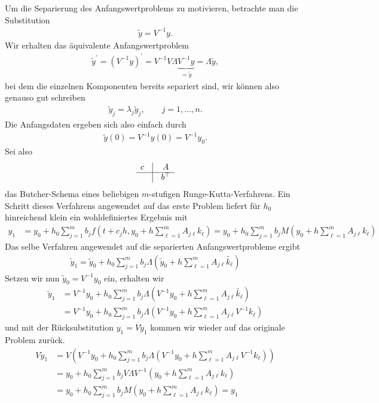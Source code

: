 \begin{solution}
Um die Separierung des Anfangswertproblems zu motivieren, betrachte man die Substitution
\begin{align*}
  \widetilde{y} = V^{-1}y.
\end{align*}
 Wir erhalten das äquivalente Anfangswertproblem
\begin{align*}
  \widetilde{y}^{\prime} = (V^{-1}y)^{\prime} = V^{-1}V\Lambda\underbrace{V^{-1}y}_{ = \widetilde{y}} = \Lambda\widetilde{y},
\end{align*}
bei dem die einzelnen Komponenten bereits separiert sind, wir können also genauso gut schreiben
\begin{align*}
  \widetilde{y}_j = \lambda_j\widetilde{y}_j, \qquad j = 1,\dots,n.
\end{align*}
Die Anfangsdaten ergeben sich also einfach durch
\begin{align*}
   \widetilde{y}(0) = V^{-1}y(0) = V^{-1}y_0.
\end{align*}
Sei also
\renewcommand{\arraystretch}{1.5}
\begin{align*}
  \begin{matrix}
    c & \vline & A \\
    \hline
    & \vline & b^{\top}
  \end{matrix}
\end{align*}
das Butcher-Schema eines beliebigen $m$-stufigen Runge-Kutta-Verfahrens.
Ein Schritt dieses Verfahrens angewendet auf das erste Problem liefert für $h_0$
hinreichend klein ein wohldefiniertes Ergebnis mit
\begin{align*}
  y_1 &= y_0 + h_0 \sum_{j=1}^m b_jf\left(t + c_jh, y_0 + h\sum_{\ell = 1}^m A_{j\ell}k_{\ell}\right)
  = y_0 + h_0 \sum_{j=1}^m b_jM\left(y_0 + h\sum_{\ell = 1}^m A_{j\ell}k_{\ell}\right)
\end{align*}
Das selbe Verfahren angewendet auf die separierten Anfangswertprobleme ergibt
\begin{align*}
  \widetilde{y}_{1} = \widetilde{y}_{0} + h_0 \sum_{j=1}^m b_j\Lambda\left(\widetilde{y}_{0} + h\sum_{\ell = 1}^m A_{j\ell}\widetilde{k_{\ell}}\right)
\end{align*}
Setzen wir nun $\widetilde{y}_{0} = V^{-1}y_0$ ein, erhalten wir
\begin{align*}
  \widetilde{y}_{1} &= V^{-1}y_0 + h_0 \sum_{j=1}^m b_j\Lambda\left(V^{-1}y_0 + h\sum_{\ell = 1}^m A_{j\ell}\widetilde{k_{\ell}}\right) \\
  &= V^{-1}y_0 + h_0 \sum_{j=1}^m b_j\Lambda\left(V^{-1}y_0 + h\sum_{\ell = 1}^m A_{j\ell}V^{-1}k_{\ell}\right)
\end{align*}
und mit der Rücksubstitution $y_1 = V\widetilde{y}_{1}$ kommen wir wieder auf
das originale Problem zurück.
\begin{align*}
  V\widetilde{y}_{1} &= V\left(V^{-1}y_0 + h_0 \sum_{j=1}^m b_j\Lambda\left(V^{-1}y_0 + h\sum_{\ell = 1}^m A_{j\ell}V^{-1}k_{\ell}\right)\right) \\
  &= y_0 + h_0 \sum_{j=1}^m b_jV\Lambda V^{-1}\left(y_0 + h\sum_{\ell = 1}^m A_{j\ell}k_{\ell}\right) \\
  &= y_0 + h_0 \sum_{j=1}^m b_jM\left(y_0 + h\sum_{\ell = 1}^m A_{j\ell}k_{\ell}\right) = y_1
\end{align*}
\end{solution}
